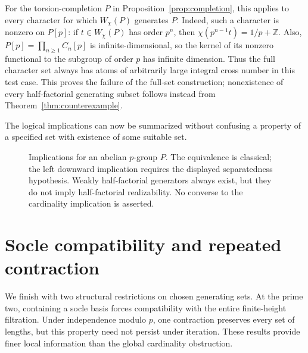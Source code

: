 \documentclass[11pt,reqno]{amsart}
\numberwithin{equation}{section}
\theoremstyle{definition}
\theoremstyle{remark}
\newcommand{\Z}{\mathbb Z}
\begin{document}
For the torsion-completion $P$ in
Proposition~\ref{prop:completion}, this applies to every character
for which $W_\chi(P)$ generates $P$. Indeed, such a character is
nonzero on $P[p]$: if $t\in W_\chi(P)$ has order $p^n$, then
$\chi(p^{n-1}t)=1/p+\Z$. Also,
$P[p]=\prod_{n\ge1}C_n[p]$ is infinite-dimensional, so the kernel
of its nonzero functional to the subgroup of order $p$ has
infinite dimension. Thus the full character set always has
atoms of arbitrarily large integral cross number in this test
case. This proves the failure of the full-set construction;
nonexistence of every half-factorial generating subset follows
instead from Theorem~\ref{thm:counterexample}.

The logical implications can now be summarized without confusing a
property of a specified set with existence of some suitable set.

\begin{figure}[htbp]
\centering
{}
\caption{Implications for an abelian $p$-group $P$. The equivalence is
classical; the left downward implication requires the displayed
separatedness hypothesis. Weakly half-factorial generators always
exist, but they do not imply half-factorial realizability. No
converse to the cardinality implication is asserted.}
\label{fig:implications}
\end{figure}

\section{Socle compatibility and repeated contraction}\label{sec:socle}

We finish with two structural restrictions on chosen generating
sets. At the prime two, containing a socle basis forces compatibility
with the entire finite-height filtration. Under independence modulo
$p$, one contraction preserves every set of lengths, but this
property need not persist under iteration. These results provide
finer local information than the global cardinality obstruction.
\end{document}

